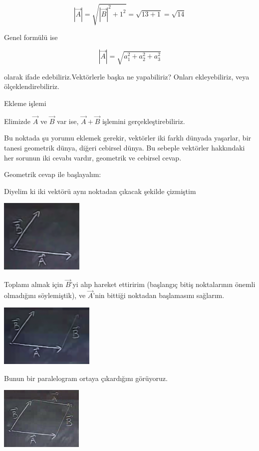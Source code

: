 \documentclass[12pt,fleqn]{article}\usepackage{../../common}
\begin{document}
$$ |\vec{A}| = \sqrt{|\vec{B}|^2 + 1^2} = \sqrt{13 + 1} = \sqrt{14} $$

Genel formülü ise

$$ |\vec{A}| = \sqrt{a_1 ^2 + a_2^2 + a_3^2} $$

olarak ifade edebiliriz.Vektörlerle başka ne yapabiliriz? Onları ekleyebiliriz, 
veya ölçeklendirebiliriz. 

Ekleme işlemi

Elimizde $\vec{A}$ ve $\vec{B}$ var ise, $\vec{A} + \vec{B}$ 
işlemini gerçekleştirebiliriz. 

Bu noktada şu yorumu eklemek gerekir, vektörler iki farklı dünyada
yaşarlar, bir tanesi geometrik dünya, diğeri cebirsel dünya. Bu sebeple 
vektörler hakkındaki her sorunun iki
cevabı vardır, geometrik ve cebirsel cevap.

Geometrik cevap ile başlayalım: 

Diyelim ki iki vektörü aynı noktadan çıkacak şekilde çizmiştim

\begin{center}
\includegraphics[height=3.5cm]{1_6.png}
\end{center}

Toplamı almak için $\vec{B}$'yi alıp hareket ettiririm (başlangıç bitiş
noktalarının önemli olmadığını söylemiştik), ve $\vec{A}$'nin bittiği
noktadan başlamasını sağlarım.

\begin{center}
\includegraphics[height=3cm]{1_7.png}
\end{center}

Bunun bir paralelogram ortaya çıkardığını görüyoruz. 

\begin{center}
\includegraphics[height=3cm]{1_8.png}
\end{center}
\end{document}
